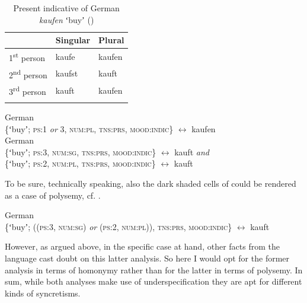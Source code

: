 \documentclass[output=paper]{langsci/langscibook}
\begin{document}
\begin{table}
\caption{Present indicative of German \textit{kaufen} ʻbuyʼ (\citealt[23]{HelbigHelbig2001})\label{tab:reiner:4}}
\begin{tabular}{lll}
\lsptoprule
 & Singular & Plural\\\midrule
1\textsuperscript{st} person & kaufe & \cellcolor{lsLightGray}kaufen\\
2\textsuperscript{nd} person & kaufst & \cellcolor{lsGuidelinesGray}kauft\\
3\textsuperscript{rd} person & \cellcolor{lsGuidelinesGray}kauft & \cellcolor{lsLightGray}kaufen\\
\lspbottomrule
\end{tabular}
\end{table}

\ea \label{ex:reiner:14} 
{German}\\
\{ʻbuyʼ; \textsc{ps}:1 \textit{or} 3, \textsc{num}:\textsc{pl}, \textsc{tns}:\textsc{prs}, \textsc{mood}:\textsc{indic}\} $\leftrightarrow $ kaufen\\
\ex \label{ex:reiner:15}
 {German}\\
\ea \textup{\{ʻbuyʼ;} \textsc{ps}\textup{:3,} \textsc{num}\textup{:}\textsc{sg}, \textsc{tns}\textup{:}\textsc{prs}, \textsc{mood}\textup{:}\textsc{indic}\textup{\} $\leftrightarrow $} kauft \textit{and}\\
\ex \textup{\{ʻbuyʼ;} \textsc{ps}\textup{:2,} \textsc{num}\textup{:}\textsc{pl}, \textsc{tns}\textup{:}\textsc{prs}, \textsc{mood}\textup{:}\textsc{indic}\textup{\} $\leftrightarrow $} kauft
\z\z


To be sure, technically speaking, also the dark shaded cells of  could be rendered as a case of polysemy, cf. .

\ea \label{ex:reiner:16}
 {German}\\ 
  \textup{\{ʻbuyʼ; ((}\textsc{ps}\textup{:3,} \textsc{num}\textup{:}\textsc{sg}\textup{) \textit{or} (}\textsc{ps}\textup{:2,} \textsc{num}\textup{:}\textsc{pl})), \textsc{tns}\textup{:}\textsc{prs}, \textsc{mood}\textup{:}\textsc{indic}\textup{\} $\leftrightarrow $} kauft
  \z

However, as argued above, in the specific case at hand, other facts from the language cast doubt on this latter analysis. So here I would opt for the former analysis in terms of homonymy rather than for the latter in terms of polysemy. In sum, while both analyses make use of underspecification they are apt for different kinds of syncretisms.
\end{document}
